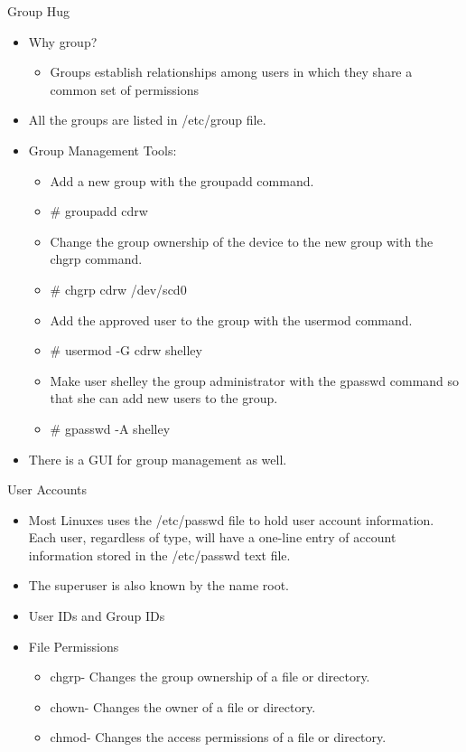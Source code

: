\documentclass{beamer}
\begin{document}
\begin{frame}{Group Hug}
\begin{itemize}
\item Why group?
\begin{itemize}
\item Groups establish relationships among users in which they share a common set of permissions
\end{itemize}
\item All the groups are listed in /etc/group file.
\item Group Management Tools:
\begin{itemize}
\item Add a new group with the groupadd command.
\item \# groupadd cdrw
\item Change the group ownership of the device to the new group with the chgrp command.
\item \# chgrp cdrw /dev/scd0
\item Add the approved user to the group with the usermod command.
\item \# usermod -G cdrw  shelley
\item Make user shelley the group administrator with the gpasswd command so that she can add new users to the group.
\item \# gpasswd -A shelley
\end{itemize}
\item There is a GUI for group management as well.
\end{itemize}
\end{frame}

\begin{frame}{User Accounts}
\begin{itemize}
\item Most Linuxes uses the /etc/passwd file to hold user account information. Each user, regardless of type, will have a one-line entry of account information stored in the /etc/passwd text file.
\item The superuser is also known by the name root. 
\item User IDs and Group IDs
\item File Permissions
\begin{itemize}
\item chgrp- Changes the group ownership of a file or directory.
\item chown- Changes the owner of a file or directory.
\item chmod- Changes the access permissions of a file or directory.
\end{itemize}
\end{itemize}
\end{frame}
\end{document}
